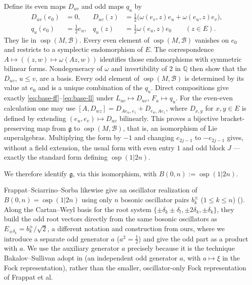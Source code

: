 \documentclass[11pt]{article}
\numberwithin{equation}{section}
\theoremstyle{remark}
\begin{document}
Define its even maps $D_{uv}$ and odd maps $q_u$ by
\begin{align*}
 D_{uv}(e_0)&=0,& D_{uv}(z)&=\tfrac{1}{2}\bigl(\omega(e_v,z)e_u+\omega(e_u,z)e_v\bigr),\\
 q_u(e_0)&=\tfrac{1}{2}e_u,& q_u(z)&=\tfrac{1}{2}\omega(e_u,z)e_0\qquad(z\in E).
\end{align*}
They lie in $\operatorname{osp}(M,\mathcal B)$. Every even element of
$\operatorname{osp}(M,\mathcal B)$ vanishes on $e_0$ and restricts to a
symplectic endomorphism of $E$. The correspondence
$A\mapsto((z,w)\mapsto\omega(Az,w))$ identifies those endomorphisms with
symmetric bilinear forms. Nondegeneracy of $\omega$ and invertibility of $2$
in $\mathbb Q$
then show that the $D_{uv}$, $u\leq v$, are a basis. Every odd element of
$\operatorname{osp}(M,\mathcal B)$ is determined by its value at $e_0$ and is a
unique combination of the $q_u$. Direct compositions give exactly \eqref{eq:base-ff}--\eqref{eq:base-ll}
under $L_{uv}\mapsto D_{uv}$, $F_u\mapsto q_u$.
For the even-even calculation one may use
$[A,D_{wz}]=D_{Ae_w,e_z}+D_{e_w,Ae_z}$, where $D_{x,y}$ for $x,y\in E$ is
defined by extending $(e_u,e_v)\mapsto D_{uv}$ bilinearly.
This proves a bijective bracket-preserving map from $\mathfrak g$ to
$\operatorname{osp}(M,\mathcal B)$, that is, an isomorphism of Lie
superalgebras. Multiplying the form by $-1$ and changing $e_{2j-1}$ to
$-e_{2j-1}$ gives, without a field extension, the usual form with even
entry $1$ and odd block $J$ --- exactly the standard form defining
$\operatorname{osp}(1|2n)$.

We therefore identify $\mathfrak g$, via this isomorphism, with
$B(0,n):=\operatorname{osp}(1|2n)$.

Frappat--Sciarrino--Sorba \cite{FSS00} likewise give an oscillator realization
of $B(0,n)=\operatorname{osp}(1|2n)$ using only $n$ bosonic oscillator
pairs $b_k^{\pm}$ ($1\le k\le n$) (\cite[\S2.30, p.~220]{FSS00}). Along the
Cartan--Weyl basis for the root system $\{\pm\delta_k\pm\delta_l,\pm2\delta_k,\pm\delta_k\}$,
they build the odd root vectors directly from the same bosonic oscillators as
$E_{\pm\delta_k}=b_k^{\pm}/\sqrt2$, a different notation and construction
from ours, where we introduce a separate odd generator $a$ ($a^2=\tfrac{1}{2}$)
and give the odd part as a product with $a$. We use the auxiliary generator
$a$ precisely because it is the technique Bakalov--Sullivan adopt in
\cite{BS17} (an independent odd generator $a$, with $a\mapsto\xi$ in the
Fock representation), rather than the smaller, oscillator-only Fock
representation of Frappat et al.
\end{document}
